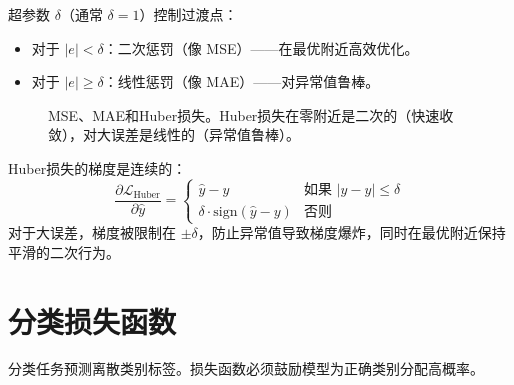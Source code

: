 超参数 $\delta$（通常 $\delta = 1$）控制过渡点：
\begin{itemize}
    \item 对于 $|e| < \delta$：二次惩罚（像 MSE）——在最优附近高效优化。
    \item 对于 $|e| \geq \delta$：线性惩罚（像 MAE）——对异常值鲁棒。
\end{itemize}

\begin{figure}[htbp]
    \centering
    \caption[回归损失函数比较]{MSE、MAE和Huber损失。Huber损失在零附近是二次的（快速收敛），对大误差是线性的（异常值鲁棒）。}
    \label{fig:regression_losses}
\end{figure}

\begin{example}[Huber损失梯度]
Huber损失的梯度是连续的：
\begin{equation}
\frac{\partial \mathcal{L}_{\text{Huber}}}{\partial \hat{y}} = 
\begin{cases}
\hat{y} - y & \text{如果 } |y - \hat{y}| \leq \delta \\
\delta \cdot \text{sign}(\hat{y} - y) & \text{否则}
\end{cases}
\end{equation}
对于大误差，梯度被限制在 $\pm \delta$，防止异常值导致梯度爆炸，同时在最优附近保持平滑的二次行为。
\end{example}

\section{分类损失函数}

分类任务预测离散类别标签。损失函数必须鼓励模型为正确类别分配高概率。

